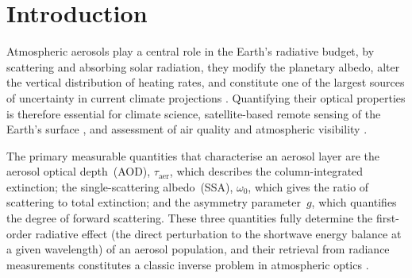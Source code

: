 \documentclass[a4paper, 11pt]{article}
\begin{document}

\begin{abstract}
\noindent
This report presents the development and validation of a one-dimensional
radiative transfer model based on the Discrete Ordinates method (DISORT) for
the retrieval of aerosol optical properties from atmospheric radiance
measurements. The forward model solves the radiative transfer equation in a
multi-layer plane-parallel atmosphere with Rayleigh scattering, Mie aerosol
optics, and surface reflection. Multiple inverse techniques (Levenberg--Marquardt,
Optimal Estimation) are
implemented and compared for retrieving aerosol optical depth, single-scattering
albedo, and asymmetry parameter profiles.
\end{abstract}

\newpage
\tableofcontents
\newpage
\listoffigures
\newpage


\section{Introduction}
\label{sec:introduction}

Atmospheric aerosols play a central role in the Earth's radiative budget, by scattering and absorbing solar radiation, they modify the planetary albedo, alter the vertical distribution of heating rates, and constitute one of the largest sources of uncertainty in current climate projections \cite{ipcc2021}.  Quantifying their optical properties is therefore essential for climate science, satellite-based remote sensing of the Earth's surface \cite{kaufman2002}, and assessment of air quality and atmospheric visibility \cite{seinfeld2016}.

The primary measurable quantities that characterise an aerosol layer are
the aerosol optical depth~(AOD), $\tau_{\text{aer}}$, which describes
the column-integrated extinction; the single-scattering
albedo~(SSA), $\omega_0$, which gives the ratio of scattering to total
extinction; and the asymmetry parameter~$g$, which quantifies the
degree of forward scattering.  These three quantities fully determine
the first-order radiative effect (the direct perturbation to the shortwave energy balance at a given wavelength) of an aerosol population, and their retrieval from radiance measurements constitutes
a classic inverse problem in atmospheric optics \cite{rodgers2000}.
\end{document}
